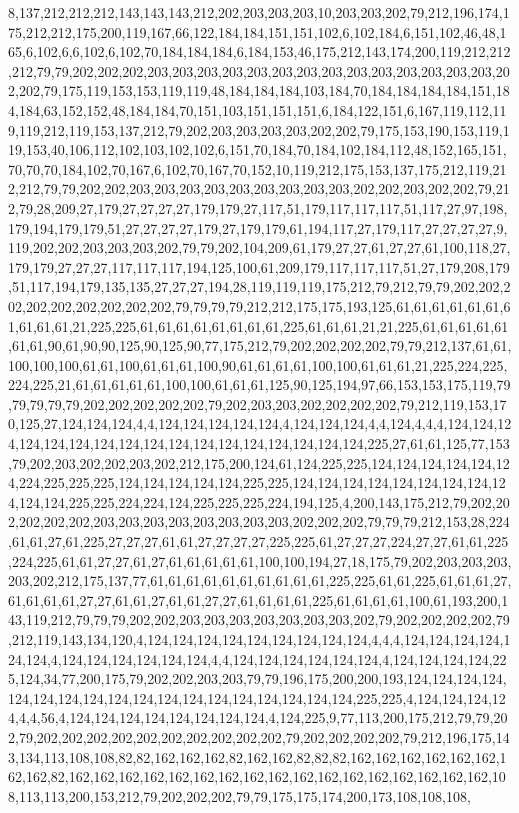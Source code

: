 8,137,212,212,212,143,143,143,212,202,203,203,203,10,203,203,202,79,212,196,174,175,212,212,175,200,119,167,66,122,184,184,151,151,102,6,102,184,6,151,102,46,48,165,6,102,6,6,102,6,102,70,184,184,184,6,184,153,46,175,212,143,174,200,119,212,212,212,79,79,202,202,202,203,203,203,203,203,203,203,203,203,203,203,203,203,203,202,202,79,175,119,153,153,119,119,48,184,184,184,103,184,70,184,184,184,184,151,184,184,63,152,152,48,184,184,70,151,103,151,151,151,6,184,122,151,6,167,119,112,119,119,212,119,153,137,212,79,202,203,203,203,203,202,202,79,175,153,190,153,119,119,153,40,106,112,102,103,102,102,6,151,70,184,70,184,102,184,112,48,152,165,151,70,70,70,184,102,70,167,6,102,70,167,70,152,10,119,212,175,153,137,175,212,119,212,212,79,79,202,202,203,203,203,203,203,203,203,203,203,202,202,203,202,202,79,212,79,28,209,27,179,27,27,27,27,179,179,27,117,51,179,117,117,117,51,117,27,97,198,179,194,179,179,51,27,27,27,27,179,27,179,179,61,194,117,27,179,117,27,27,27,27,9,119,202,202,203,203,203,202,79,79,202,104,209,61,179,27,27,61,27,27,61,100,118,27,179,179,27,27,27,117,117,117,194,125,100,61,209,179,117,117,117,51,27,179,208,179,51,117,194,179,135,135,27,27,27,194,28,119,119,119,175,212,79,212,79,79,202,202,202,202,202,202,202,202,202,79,79,79,79,212,212,175,175,193,125,61,61,61,61,61,61,61,61,61,61,21,225,225,61,61,61,61,61,61,61,61,225,61,61,61,21,21,225,61,61,61,61,61,61,61,90,61,90,90,125,90,125,90,77,175,212,79,202,202,202,202,79,79,212,137,61,61,100,100,100,61,61,100,61,61,61,100,90,61,61,61,61,100,100,61,61,61,21,225,224,225,224,225,21,61,61,61,61,61,100,100,61,61,61,125,90,125,194,97,66,153,153,175,119,79,79,79,79,79,202,202,202,202,202,79,202,203,203,202,202,202,202,79,212,119,153,170,125,27,124,124,124,4,4,124,124,124,124,124,4,124,124,124,4,4,124,4,4,4,124,124,124,124,124,124,124,124,124,124,124,124,124,124,124,124,124,225,27,61,61,125,77,153,79,202,203,202,202,203,202,212,175,200,124,61,124,225,225,124,124,124,124,124,124,224,225,225,225,124,124,124,124,124,225,225,124,124,124,124,124,124,124,124,124,124,124,225,225,224,224,124,225,225,225,224,194,125,4,200,143,175,212,79,202,202,202,202,202,203,203,203,203,203,203,203,203,202,202,202,79,79,79,212,153,28,224,61,61,27,61,225,27,27,27,61,61,27,27,27,27,225,225,61,27,27,27,224,27,27,61,61,225,224,225,61,61,27,27,61,27,61,61,61,61,61,100,100,194,27,18,175,79,202,203,203,203,203,202,212,175,137,77,61,61,61,61,61,61,61,61,61,61,225,225,61,61,225,61,61,61,27,61,61,61,61,27,27,61,61,27,61,61,27,27,61,61,61,61,225,61,61,61,61,100,61,193,200,143,119,212,79,79,79,202,202,203,203,203,203,203,203,203,202,79,202,202,202,202,79,212,119,143,134,120,4,124,124,124,124,124,124,124,124,124,4,4,4,124,124,124,124,124,124,4,124,124,124,124,124,124,4,4,124,124,124,124,124,124,4,124,124,124,124,225,124,34,77,200,175,79,202,202,203,203,79,79,196,175,200,200,193,124,124,124,124,124,124,124,124,124,124,124,124,124,124,124,124,124,124,225,225,4,124,124,124,124,4,4,56,4,124,124,124,124,124,124,124,124,4,124,225,9,77,113,200,175,212,79,79,202,79,202,202,202,202,202,202,202,202,202,202,79,202,202,202,202,79,212,196,175,143,134,113,108,108,82,82,162,162,162,82,162,162,82,82,82,162,162,162,162,162,162,162,162,82,162,162,162,162,162,162,162,162,162,162,162,162,162,162,162,162,162,108,113,113,200,153,212,79,202,202,202,79,79,175,175,174,200,173,108,108,108,